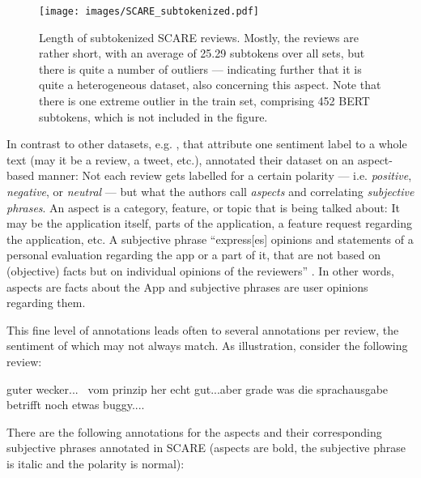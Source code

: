 \begin{wrapfigure}[24]{r}{0.45\linewidth}
  \centering
    \texttt{[image: images/SCARE\_subtokenized.pdf]}
  \caption[SCARE Lengths]{Length of subtokenized SCARE reviews. Mostly, the reviews are rather
    short, with an average of 25.29 subtokens over all sets, but there is quite a number of
    outliers --- indicating further that it is quite a heterogeneous dataset, also concerning
    this aspect. Note that there is one extreme outlier in the train set, comprising 452 BERT
    subtokens, which is not included in the figure.}
  \label{fig:scare-subtokenized}
\end{wrapfigure}

In contrast to other datasets, e.g. \citep{socher2013recursive, go2009twitter},
that attribute one sentiment label to a whole text (may it be a review, a tweet,
etc.), \cite{sanger2016scare} annotated their dataset on an aspect-based manner:
Not each review gets labelled for a certain polarity --- i.e. \emph{positive},
\emph{negative}, or \emph{neutral} --- but what the authors call \emph{aspects} and
correlating \emph{subjective phrases}. An aspect is a category, feature, or
topic that is being talked about: It may be the application itself, parts of the
application, a feature request regarding the application, etc. A subjective phrase
``express[es] opinions and statements of a personal evaluation regarding the app or
a part of it, that are not based on (objective) facts but on individual opinions of
the reviewers'' \citep[p.~1116]{sanger2016scare}. In other words, aspects are facts
about the App and subjective phrases are user opinions regarding them.

This fine level of annotations leads often to several annotations per review, the sentiment of
which may not always match.
As illustration, consider the following review:

\begin{examples}
  \label{ex:fine-grained-anno}
  \item guter wecker... \textbar\textbar\ vom prinzip her echt gut...aber grade was die sprachausgabe betrifft noch etwas buggy....
\end{examples}

There are the following annotations for the aspects and their corresponding subjective
phrases annotated in SCARE (aspects are bold, the subjective phrase is italic and the
polarity is normal):


